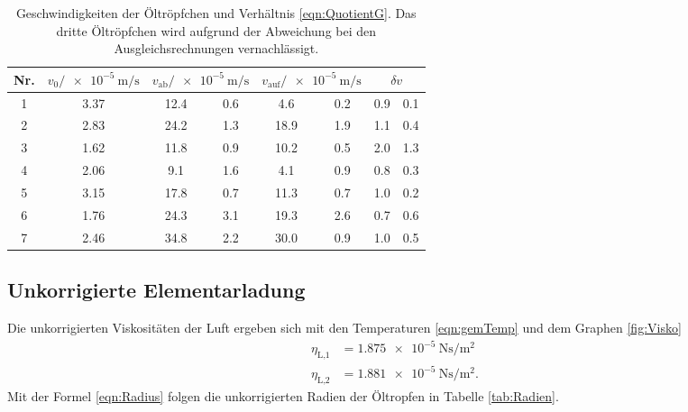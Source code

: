 \begin{table}[h]
  \centering
  \begin{tabular}{S S S[table-format=2.1] @{${}\pm{}$} S[table-format=1.1]
    S[table-format=2.1] @{${}\pm{}$} S[table-format=1.1] S @{${}\pm{}$} S}
    \toprule
    {Nr.} & {$v_0/\SI{e-5}{\meter\per\second}$} &  &
     &  \\
     & 3.37 & 12.4 & 0.6 & 4.6  & 0.2 & 0.9 & 0.1 \\
    2 & 2.83 & 24.2 & 1.3 & 18.9 & 1.9 & 1.1  & 0.4 \\
    3 & 1.62 & 11.8 & 0.9 & 10.2 & 0.5 & 2.0  & 1.3 \\
    4 & 2.06 & 9.1  & 1.6 & 4.1  & 0.9 & 0.8 & 0.3 \\
    5 & 3.15 & 17.8 & 0.7 & 11.3 & 0.7 & 1.0 & 0.2 \\
    6 & 1.76 & 24.3 & 3.1 & 19.3 & 2.6 & 0.7  & 0.6 \\
    7 & 2.46 & 34.8 & 2.2 & 30.0 & 0.9 & 1.0  & 0.5 \\
    \bottomrule
  \end{tabular}
  \caption{Geschwindigkeiten der Öltröpfchen und Verhältnis
  \eqref{eqn:QuotientG}. Das dritte Öltröpfchen wird aufgrund der Abweichung
  bei den Ausgleichsrechnungen vernachlässigt.}
  \label{tab:Geschw}
\end{table}

\FloatBarrier

\subsection{Unkorrigierte Elementarladung}
\label{sec:unkoel}

Die unkorrigierten Viskositäten der Luft ergeben sich mit den Temperaturen
\eqref{eqn:gemTemp} und dem Graphen \ref{fig:Visko}
\begin{align}
  \eta_\text{L,1} & = \SI{1.875e-5}{\newton\second\per\square\meter} \\
  \eta_\text{L,2} & = \SI{1.881e-5}{\newton\second\per\square\meter}.
\end{align}
Mit der Formel \eqref{eqn:Radius} folgen die unkorrigierten Radien der Öltropfen
in Tabelle \ref{tab:Radien}.

